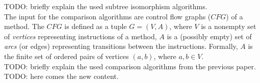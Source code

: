 TODO: briefly explain the used subtree isomorphism algorithms.
\\

The input  for the comparison algorithms are control flow graphs ($CFG$) of a method.
The $CFG$ is defined as a tuple $G=(V, A)$, where  
$V$ is a nonempty set of \textit{vertices} representing instructions of a method,
$A$ is a (possibly empty) set of \textit{arcs} (or edges) representing transitions between the instructions.
Formally, $A$ is the finite set of ordered pairs of vertices $(a, b)$, where $a,b \in V$.
\\

TODO:  briefly explain the used comparison algorithms from the previous paper.
\\

TODO: here comes the new content.





